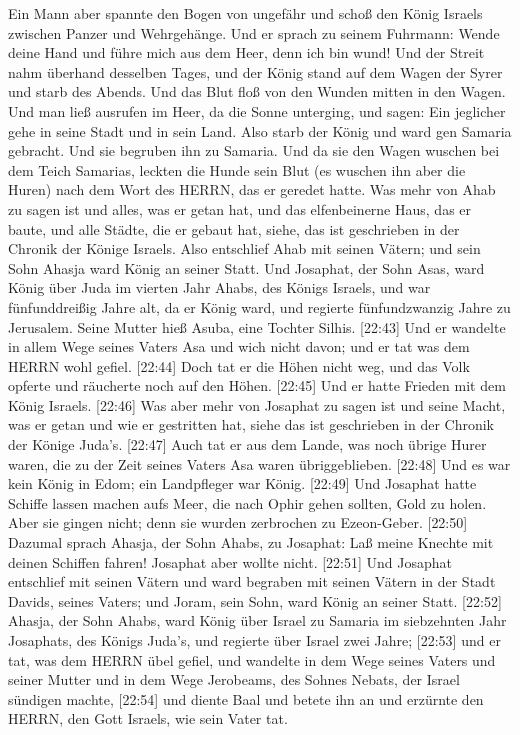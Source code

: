Ein Mann aber spannte den Bogen von ungefähr und schoß den König Israels
zwischen Panzer und Wehrgehänge. Und er sprach zu seinem Fuhrmann: Wende
deine Hand und führe mich aus dem Heer, denn ich bin wund! 
Und der Streit nahm überhand desselben Tages, und der König stand auf
dem Wagen der Syrer und starb des Abends. Und das Blut floß von den
Wunden mitten in den Wagen.  Und man ließ ausrufen im Heer,
da die Sonne unterging, und sagen: Ein jeglicher gehe in seine Stadt und
in sein Land.  Also starb der König und ward gen Samaria
gebracht. Und sie begruben ihn zu Samaria.  Und da sie den
Wagen wuschen bei dem Teich Samarias, leckten die Hunde sein Blut (es
wuschen ihn aber die Huren) nach dem Wort des HERRN, das er geredet
hatte.  Was mehr von Ahab zu sagen ist und alles, was er
getan hat, und das elfenbeinerne Haus, das er baute, und alle Städte,
die er gebaut hat, siehe, das ist geschrieben in der Chronik der Könige
Israels.  Also entschlief Ahab mit seinen Vätern; und sein
Sohn Ahasja ward König an seiner Statt.  Und Josaphat, der
Sohn Asas, ward König über Juda im vierten Jahr Ahabs, des Königs
Israels,  und war fünfunddreißig Jahre alt, da er König
ward, und regierte fünfundzwanzig Jahre zu Jerusalem. Seine Mutter hieß
Asuba, eine Tochter Silhis. {[}22:43{]} Und er wandelte in allem Wege
seines Vaters Asa und wich nicht davon; und er tat was dem HERRN wohl
gefiel.  {[}22:44{]} Doch tat er die Höhen nicht weg, und
das Volk opferte und räucherte noch auf den Höhen. 
{[}22:45{]} Und er hatte Frieden mit dem König Israels. 
{[}22:46{]} Was aber mehr von Josaphat zu sagen ist und seine Macht, was
er getan und wie er gestritten hat, siehe das ist geschrieben in der
Chronik der Könige Juda's.  {[}22:47{]} Auch tat er aus dem
Lande, was noch übrige Hurer waren, die zu der Zeit seines Vaters Asa
waren übriggeblieben.  {[}22:48{]} Und es war kein König in
Edom; ein Landpfleger war König.  {[}22:49{]} Und Josaphat
hatte Schiffe lassen machen aufs Meer, die nach Ophir gehen sollten,
Gold zu holen. Aber sie gingen nicht; denn sie wurden zerbrochen zu
Ezeon-Geber.  {[}22:50{]} Dazumal sprach Ahasja, der Sohn
Ahabs, zu Josaphat: Laß meine Knechte mit deinen Schiffen fahren!
Josaphat aber wollte nicht.  {[}22:51{]} Und Josaphat
entschlief mit seinen Vätern und ward begraben mit seinen Vätern in der
Stadt Davids, seines Vaters; und Joram, sein Sohn, ward König an seiner
Statt.  {[}22:52{]} Ahasja, der Sohn Ahabs, ward König über
Israel zu Samaria im siebzehnten Jahr Josaphats, des Königs Juda's, und
regierte über Israel zwei Jahre;  {[}22:53{]} und er tat,
was dem HERRN übel gefiel, und wandelte in dem Wege seines Vaters und
seiner Mutter und in dem Wege Jerobeams, des Sohnes Nebats, der Israel
sündigen machte,  {[}22:54{]} und diente Baal und betete
ihn an und erzürnte den HERRN, den Gott Israels, wie sein Vater tat.
